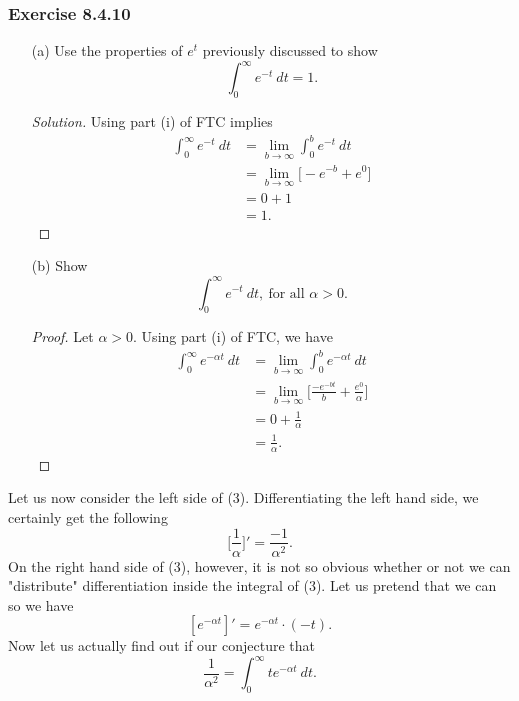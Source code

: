 \subsubsection{Exercise 8.4.10} 
\begin{enumerate}
    \item[(a)] Use the properties of \( e^{t} \) previously discussed to show 
        \[  \int_{ 0 }^{ \infty  }  e^{-t} \  dt = 1 . \]
        \begin{proof}[Solution]
        Using part (i) of FTC implies
        \begin{align*}
            \int_{ 0 }^{ \infty  }  e^{-t} \ dt &= \lim_{ b \to \infty  } \int_{ 0 }^{ b }  e^{-t} \ dt \\
                                                &= \lim_{ b \to \infty  }  \Big[ - e^{-b} + e^{0} \Big] \\
                                                &= 0 + 1 \\
                                                &= 1.
        \end{align*}
        \end{proof}
    \item[(b)] Show
        \[  \int_{ 0  }^{ \infty  }  e^{-t} \  dt, \ \text{for all } \alpha > 0. \tag{3} \]
        \begin{proof}
        Let \( \alpha > 0  \). Using part (i) of FTC, we have
        \begin{align*}
            \int_{ 0 }^{ \infty  }  e^{- \alpha t} \ dt &= \lim_{ b \to \infty  }  \int_{ 0 }^{ b }  e^{-\alpha t } \  dt \\
                                                        &= \lim_{ b \to \infty  }  \Big[ \frac{ -e^{- b t } }{ b } + \frac{ e^{0} }{ \alpha }    \Big] \\
                                                        &= 0 + \frac{ 1 }{ \alpha } \\
                                                        &= \frac{ 1 }{\alpha }.
        \end{align*}
        \end{proof}
\end{enumerate}

Let us now consider the left side of (3). Differentiating the left hand side, we certainly get the following 
\[  \Big[ \frac{ 1 }{ \alpha  }  \Big]' = \frac{ -1 }{ \alpha^{2} }. \] On the right hand side of (3), however, it is not so obvious whether or not we can "distribute" differentiation inside the integral of (3). Let us pretend that we can so we have 
\[  [e^{- \alpha t }]' = e^{- \alpha t } \cdot (-t). \]
Now let us actually find out if our conjecture that 
\[  \frac{ 1 }{ \alpha^{2}  }  = \int_{ 0 }^{ \infty  }  t e^{-\alpha t } \ dt.  \]

